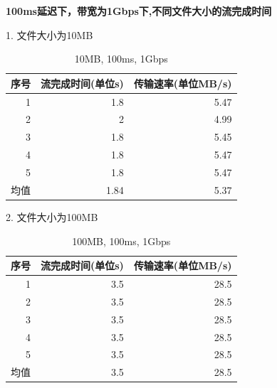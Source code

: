 \documentclass[11pt]{article}
\begin{document}
\textbf{100ms延迟下，带宽为1Gbps下,不同文件大小的流完成时间}

1. 文件大小为10MB

\begin{table}[htbp]
  \centering
  \caption{10MB, 100ms, 1Gbps}
    \begin{tabular}{|l|r|r|}
    \hline
    序号    & \multicolumn{1}{l|}{流完成时间(单位s)} & \multicolumn{1}{l|}{传输速率(单位MB/s)} \bigstrut\\
    \hline
    \multicolumn{1}{|r|}{1} & 1.8   & 5.47 \bigstrut\\
    \hline
    \multicolumn{1}{|r|}{2} & 2     & 4.99 \bigstrut\\
    \hline
    \multicolumn{1}{|r|}{3} & 1.8   & 5.45 \bigstrut\\
    \hline
    \multicolumn{1}{|r|}{4} & 1.8   & 5.47 \bigstrut\\
    \hline
    \multicolumn{1}{|r|}{5} & 1.8   & 5.47 \bigstrut\\
    \hline
    均值    & 1.84  & 5.37 \bigstrut\\
    \hline
    \end{tabular}%
  
\end{table}%


2. 文件大小为100MB


\begin{table}[htbp]
  \centering
  \caption{100MB, 100ms, 1Gbps}
    \begin{tabular}{|l|r|r|}
    \hline
    序号    & \multicolumn{1}{l|}{流完成时间(单位s)} & \multicolumn{1}{l|}{传输速率(单位MB/s)} \bigstrut\\
    \hline
    \multicolumn{1}{|r|}{1} & 3.5   & 28.5 \bigstrut\\
    \hline
    \multicolumn{1}{|r|}{2} & 3.5   & 28.5 \bigstrut\\
    \hline
    \multicolumn{1}{|r|}{3} & 3.5   & 28.5 \bigstrut\\
    \hline
    \multicolumn{1}{|r|}{4} & 3.5   & 28.5 \bigstrut\\
    \hline
    \multicolumn{1}{|r|}{5} & 3.5   & 28.5 \bigstrut\\
    \hline
    均值    & 3.5   & 28.5 \bigstrut\\
    \hline
    \end{tabular}%
  
\end{table}%
\end{document}
